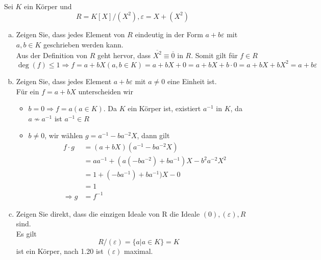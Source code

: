 \documentclass{article}
\begin{document}
\subsection{}
\color{blue}
Sei $K$ ein Körper und
\begin{equation*}
    R=K[X]/(X^2),\varepsilon=X+(X^2)
\end{equation*}
\color{black}
\begin{enumerate}[(a)]
    \item
        \color{blue}
        Zeigen Sie, dass jedes Element von $R$ eindeutig in der Form $a+b\varepsilon$ mit $a,b\in K$
        geschrieben werden kann.\\
        \color{black}
        Aus der Definition von $R$ geht hervor, dass $\overline{X^2}\equiv\overline{0}$ in $R$. Somit gilt für $f\in R$
        \begin{equation*}
            \deg(f)\leq 1\Rightarrow f=a+bX (a,b\in K)=a+bX+0=a+bX+b\cdot 0=a+bX+bX^2=a+b\varepsilon
        \end{equation*}
    \item
        \color{blue}
        Zeigen Sie, dass jedes Element $a+b\varepsilon$ mit $a\neq 0$ eine Einheit ist.\\
        \color{black}
        Für ein $f=a+bX$ unterscheiden wir
        \begin{itemize}
            \item $b=0\Rightarrow f=a (a\in K)$. Da $K$ ein Körper ist, existiert $a^{-1}$ in $K$, da $a\nsim a^{-1}$
                ist $a^{-1}\in R$
            \item $b\neq 0$, wir wählen $g=a^{-1}-ba^{-2}X$, dann gilt
                \begin{align*}
                    f\cdot g&=(a+bX)(a^{-1}-ba^{-2}X)\\
                    &=aa^{-1}+(a(-ba^{-2})+ba^{-1})X-b^2a^{-2}X^2\\
                    &=1+(-ba^{-1})+ba^{-1})X-0\\
                    &=1\\
                    \Rightarrow g&=f^{-1}
                \end{align*}
        \end{itemize}
    \item
        \color{blue}
        Zeigen Sie direkt, dass die einzigen Ideale von R die Ideale $(0),(\varepsilon),R$ sind.\\
        \color{black}
        Es gilt
        \begin{equation*}
            R/(\varepsilon)=\{a|a\in K\}=K
        \end{equation*}
        ist ein Körper, nach 1.20 ist $(\varepsilon)$ maximal.


\end{enumerate}
\end{document}
